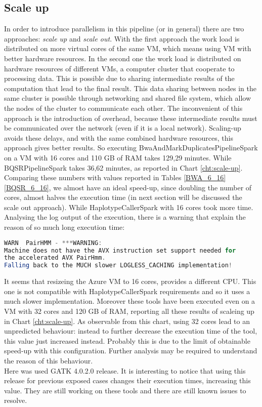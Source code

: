 \subsection{Scale up}
In order to introduce parallelism in this pipeline (or in general) there are two approaches: \textit{scale up} and \textit{scale out}.\newline
With the first approach the work load is distributed on more virtual cores of the same VM, which means using VM with better hardware resources. In the second one the work load is distributed on hardware resources of different VMs, a computer cluster that cooperate to processing data. This is possible due to sharing intermediate results of the computation that lead to the final result. This data sharing between nodes in the same cluster is possible through networking and shared file system, which allow the nodes of the cluster to communicate each other. The inconvenient of this approach is the introduction of overhead, because these intermediate results must be communicated over the network (even if it is a local network). Scaling-up avoids these delays, and with the same combined hardware resources, this approach gives better results. So executing BwaAndMarkDuplicatesPipelineSpark on a VM with 16 cores and 110 GB of RAM takes 129,29 minutes. While BQSRPipelineSpark takes 36,62 minutes, as reported in Chart \ref{cht:scale-up}. Comparing these numbers with values reported in Tables \ref{BWA_6_16} \ref{BQSR_6_16}, we almost have an ideal speed-up, since doubling the number of cores, almost halves the execution time (in next section will be discussed the scale out approach).\newline
While HaplotypeCallerSpark with 16 cores took more time. Analysing the log output of the execution, there is a warning that explain the reason of so much long execution time:
\begin{lstlisting}[language=Java,caption={Missing AVX instruction}]
WARN  PairHMM - ***WARNING: 
Machine does not have the AVX instruction set support needed for
the accelerated AVX PairHmm. 
Falling back to the MUCH slower LOGLESS_CACHING implementation!
\end{lstlisting}
It seems that resizeing the Azure VM to 16 cores, provides a different CPU. This one is not compatible with HaplotypeCallerSpark requirements and so it uses a much slower implementation.\newline
Moreover these tools have been executed even on a VM with 32 cores and 120 GB of RAM, reporting all these results of scaleing up in Chart \ref{cht:scale-up}. As observable from this chart, using 32 cores lead to an unpredicted behaviour: instead to further decrease the execution time of the tool, this value just increased instead. Probably this is due to the limit of obtainable speed-up with this configuration. Further analysis may be required to understand the reason of this behaviour. 
\\[1\baselineskip]
Here was used GATK 4.0.2.0 release. It is interesting to notice that using this release for previous exposed cases changes their execution times, increasing this value. They are still working on these tools and there are still known issues to resolve.

